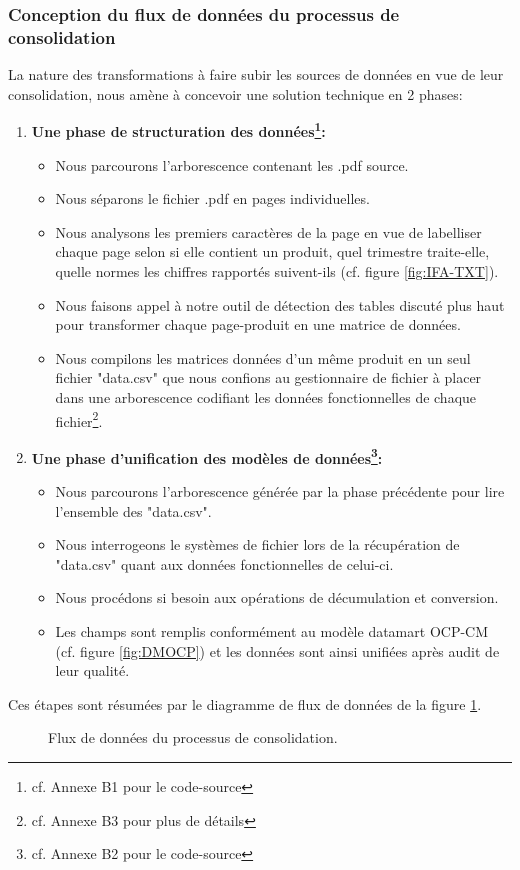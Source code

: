 	\subsubsection{Conception du flux de données du processus de consolidation} \label{struct}
	La nature des transformations à faire subir les sources de données en vue de leur consolidation, nous amène à concevoir une solution technique en 2 phases:
	\begin{enumerate}
	\item \textbf{Une phase de structuration des données\footnote{cf. Annexe B1 pour le code-source}:}
	\begin{itemize}
	\item Nous parcourons l'arborescence contenant les .pdf source.
	\item Nous séparons le fichier .pdf en pages individuelles.
	\item Nous analysons les premiers caractères de la page en vue de labelliser chaque page selon si elle contient un produit, quel trimestre traite-elle, quelle normes les chiffres rapportés suivent-ils (cf. figure \ref{fig:IFA-TXT}).
	\item Nous faisons appel à notre outil de détection des tables discuté plus haut pour transformer chaque page-produit en une matrice de données.
	\item Nous compilons les matrices données d'un même produit en un seul fichier "data.csv" que nous confions au gestionnaire de fichier à placer dans une arborescence codifiant les données fonctionnelles de chaque fichier\footnote{cf. Annexe B3 pour plus de détails}.
	\end{itemize}
	\item \textbf{Une phase d'unification des modèles de données\footnote{cf. Annexe B2 pour le code-source}:}
	\begin{itemize}
	\item Nous parcourons l'arborescence générée par la phase précédente pour lire l'ensemble des "data.csv".
	\item Nous interrogeons le systèmes de fichier lors de la récupération de "data.csv" quant aux données fonctionnelles de celui-ci.
	\item Nous procédons si besoin aux opérations de décumulation et conversion.
	\item Les champs sont remplis conformément au modèle datamart OCP-CM (cf. figure \ref{fig:DMOCP}) et les données sont ainsi unifiées après audit de leur qualité.
	\end{itemize}
	\end{enumerate}
	Ces étapes sont résumées par le diagramme de flux de données de la figure \ref{fig:DF}.
		\begin{figure}[h]
		    		\centering
		    		\caption{Flux de données du processus de consolidation.}
		    		\label{fig:DF}
		\end{figure}
